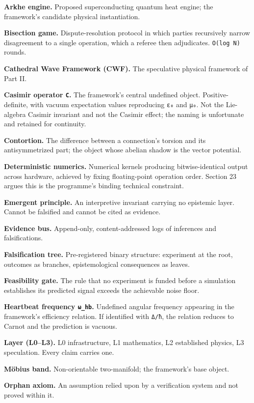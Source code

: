 \documentclass[
  11pt]{report}
\begin{document}
\textbf{Arkhe engine.} Proposed superconducting quantum heat engine; the
framework's candidate physical instantiation.

\textbf{Bisection game.} Dispute-resolution protocol in which parties
recursively narrow disagreement to a single operation, which a referee
then adjudicates. \texttt{O(log\ N)} rounds.

\textbf{Cathedral Wave Framework (CWF).} The speculative physical
framework of Part II.

\textbf{Casimir operator \texttt{C}.} The framework's central undefined
object. Positive-definite, with vacuum expectation values reproducing
\texttt{ε₀} and \texttt{μ₀}. Not the Lie-algebra Casimir invariant and
not the Casimir effect; the naming is unfortunate and retained for
continuity.

\textbf{Contortion.} The difference between a connection's torsion and
its antisymmetrized part; the object whose abelian shadow is the vector
potential.

\textbf{Deterministic numerics.} Numerical kernels producing
bitwise-identical output across hardware, achieved by fixing
floating-point operation order. Section 23 argues this is the
programme's binding technical constraint.

\textbf{Emergent principle.} An interpretive invariant carrying no
epistemic layer. Cannot be falsified and cannot be cited as evidence.

\textbf{Evidence bus.} Append-only, content-addressed logs of inferences
and falsifications.

\textbf{Falsification tree.} Pre-registered binary structure: experiment
at the root, outcomes as branches, epistemological consequences as
leaves.

\textbf{Feasibility gate.} The rule that no experiment is funded before
a simulation establishes its predicted signal exceeds the achievable
noise floor.

\textbf{Heartbeat frequency \texttt{ω\_hb}.} Undefined angular frequency
appearing in the framework's efficiency relation. If identified with
\texttt{Δ/ħ}, the relation reduces to Carnot and the prediction is
vacuous.

\textbf{Layer (L0--L3).} L0 infrastructure, L1 mathematics, L2
established physics, L3 speculation. Every claim carries one.

\textbf{Möbius band.} Non-orientable two-manifold; the framework's base
object.

\textbf{Orphan axiom.} An assumption relied upon by a verification
system and not proved within it.
\end{document}
